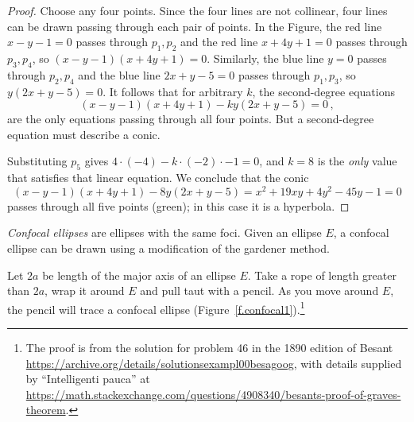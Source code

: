 \begin{proof}
Choose any four points. Since the four lines are not collinear, four lines can be drawn passing through each pair of points. In the Figure, the red line $x-y-1=0$ passes through $p_1, p_2$ and the red line $x+4y+1=0$ passes through $p_3,p_4$, so $(x-y-1)(x+4y+1)=0$. Similarly, the blue line $y=0$ passes through $p_2,p_4$ and the blue line $2x+y-5=0$ passes through $p_1,p_3$, so $y(2x+y-5)=0$. It follows that for arbitrary $k$, the second-degree equations
\[
(x-y-1)(x+4y+1) - ky(2x+y-5)=0\,,
\]
are the only equations passing through all four points. But a second-degree equation must describe a conic.

Substituting $p_5$ gives $4\cdot (-4) - k\cdot (-2)\cdot -1=0$, and $k=8$ is the \emph{only} value that satisfies that linear equation. We conclude that the conic
\[
(x-y-1)(x+4y+1) - 8y(2x+y-5)=x^2+19xy+4y^2-45y-1=0
\]
passes through all five points (green); in this case it is a hyperbola.\hqed
\end{proof}


\emph{Confocal ellipses} are ellipses with the same foci. Given an ellipse $E$, a confocal ellipse can be drawn using a modification of the gardener method. 

\begin{theorem}
Let $2a$ be length of the major axis of an ellipse $E$. Take a rope of length greater than $2a$, wrap it around $E$ and pull taut with a pencil. As you move around $E$, the pencil will trace a confocal ellipse (Figure~\ref{f.confocal1}).\footnote{The proof is from the solution for problem 46 in the 1890 edition of Besant \url{https://archive.org/details/solutionsexampl00besagoog}, with details supplied by ``Intelligenti pauca'' at \url{https://math.stackexchange.com/questions/4908340/besants-proof-of-graves-theorem}.}
\end{theorem}

